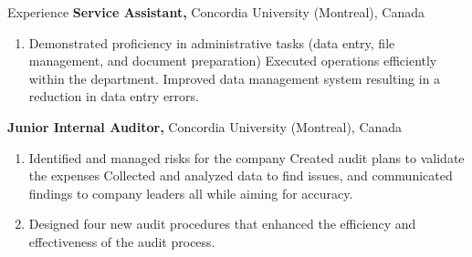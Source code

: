 \begin{rubric}{Experience}
%
    \textbf{Service Assistant,} Concordia University (Montreal), Canada
 
 \begin{enumerate}[noitemsep, topsep=0pt, left=-12em, labelwidth=12em]
 \item Demonstrated proficiency in administrative tasks (data entry, file management, and document preparation) \textbullet{} Executed operations efficiently within the department. \textbullet{} Improved data management system resulting in a reduction in data entry errors. 
 \end{enumerate}

    \textbf{Junior Internal Auditor,} Concordia University (Montreal), Canada
 
 \begin{enumerate}[noitemsep, topsep=0pt, left=-12em, labelwidth=12em]
 \item Identified and managed risks for the company \textbullet{} Created audit plans to validate the expenses \textbullet{} Collected and analyzed data to find issues, and communicated findings to company leaders all while aiming for accuracy.
 \item Designed four new audit procedures that enhanced the efficiency and effectiveness of the audit process. 
 \end{enumerate}
%
\end{rubric}